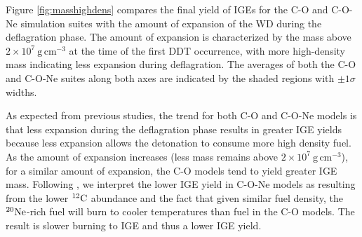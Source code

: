 \documentclass[iop,apj]{emulateapj}
\newcommand{\C}[1]{\ensuremath{{}^{#1}{\rm C}}}
\newcommand{\Ne}[1]{\ensuremath{{}^{#1}{\rm Ne}}}
\newcommand{\unitspace}{\ensuremath{\,}}
\newcommand{\usp}{\unitspace}
\newcommand{\unitstyle}[1]{\ensuremath{\mathrm{#1}}}
\newcommand{\power}[2]{\ensuremath{{#1}^{#2}}}
\newcommand{\centi}{\unitstyle{c}}
\newcommand{\meter}{\unitstyle{m}}
\newcommand{\cm}{\centi\meter}
\newcommand{\gram}{\unitstyle{g}}
\newcommand{\grampercc}{\gram\usp\power{\cm}{-3}} %
\begin{document}
Figure \ref{fig:masshighdens} compares the final yield of IGEs
for the C-O and C-O-Ne simulation suites with the amount of expansion of the
WD during the deflagration phase. The amount of expansion is
characterized by the mass above $2 \times 10^7~\grampercc$ at the
time of the first DDT occurrence, with more high-density mass
indicating less expansion during deflagration. The averages of both
the C-O and C-O-Ne suites along both axes are indicated by the shaded
regions with $\pm1\sigma$ widths.

As expected from previous studies, the trend for both C-O and C-O-Ne
models is that less expansion during the deflagration phase results in
greater IGE yields because less expansion allows the detonation to
consume more high density fuel.
As the amount of expansion increases (less
mass remains above $2 \times 10^7~\grampercc$),
for a similar amount of expansion, the C-O
models tend to yield greater IGE mass. Following
\citet{willcoxetal2016}, we interpret
the lower IGE yield in C-O-Ne models as resulting
from the lower \C{12} abundance and the fact that given
similar fuel density, the \Ne{20}-rich fuel will burn to cooler
temperatures than fuel in the C-O models. The result is
slower burning to IGE and thus a lower IGE yield.
\end{document}
